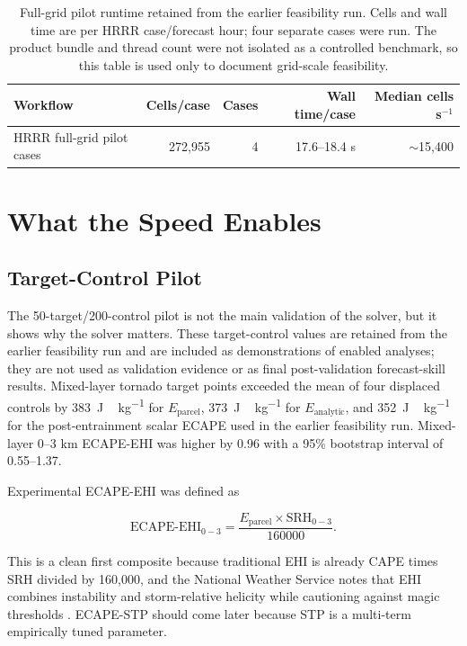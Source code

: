 \documentclass[11pt]{article}
\begin{document}
\begin{table}[H]
\centering
\caption{Full-grid pilot runtime retained from the earlier feasibility run. Cells and wall time are per HRRR case/forecast hour; four separate cases were run. The product bundle and thread count were not isolated as a controlled benchmark, so this table is used only to document grid-scale feasibility.}
\label{tab:gridruntime}
\begin{tabular}{lrrrr}
\toprule
Workflow & Cells/case & Cases & Wall time/case & Median cells s$^{-1}$ \\
\midrule
HRRR full-grid pilot cases & 272,955 & 4 & 17.6--18.4 s & $\sim$15,400 \\
\bottomrule
\end{tabular}
\end{table}

\section{What the Speed Enables}

\subsection{Target-Control Pilot}

The 50-target/200-control pilot is not the main validation of the solver, but it shows why the solver matters. These target-control values are retained from the earlier feasibility run and are included as demonstrations of enabled analyses; they are not used as validation evidence or as final post-validation forecast-skill results. Mixed-layer tornado target points exceeded the mean of four displaced controls by \SI{383}{J\,kg^{-1}} for $E_{\mathrm{parcel}}$, \SI{373}{J\,kg^{-1}} for $E_{\mathrm{analytic}}$, and \SI{352}{J\,kg^{-1}} for the post-entrainment scalar ECAPE used in the earlier feasibility run. Mixed-layer 0--3 km ECAPE-EHI was higher by 0.96 with a 95\% bootstrap interval of 0.55--1.37.

Experimental ECAPE-EHI was defined as

\begin{equation}
\mathrm{ECAPE\text{-}EHI}_{0-3} =
\frac{E_{\mathrm{parcel}}\times \mathrm{SRH}_{0-3}}{160000}.
\end{equation}

This is a clean first composite because traditional EHI is already CAPE times SRH divided by 160,000, and the National Weather Service notes that EHI combines instability and storm-relative helicity while cautioning against magic thresholds \cite{nwsehi}. ECAPE-STP should come later because STP is a multi-term empirically tuned parameter.
\end{document}
